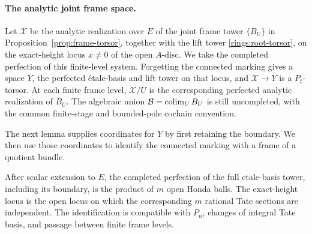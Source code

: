 \paragraph{The analytic joint frame space.}
Let $\mathcal X$ be the analytic realization over $E$ of the
joint frame tower $\{B_U\}$ in Proposition~\ref{prop:frame-torsor},
together with the lift tower \eqref{rings:root-torsor}, on the
exact-height locus $x\ne0$ of the open $A$-disc.  We take the
completed perfection of this finite-level system.  Forgetting the
connected marking gives a space $Y$, the perfected \'etale-basis
and lift tower on that locus, and $\mathcal X\to Y$ is a
$P_t$-torsor.  At each finite frame level, $\mathcal X/U$ is the
corresponding perfected analytic realization of $B_U$.
The algebraic union $\mathcal B=\operatorname*{colim}_U B_U$ is still uncompleted,
with the common finite-stage and bounded-pole cochain convention.

The next lemma supplies coordinates for $Y$ by first retaining
the boundary.  We then use those coordinates to identify the
connected marking with a frame of a quotient bundle.

\begin{lemma}\label{support:tate-ball}
After scalar extension to $E$, the completed perfection of the full
etale-basis tower, including its boundary, is the product of $m$ open
Honda balls.  The exact-height locus is the open locus on which the
corresponding $m$ rational Tate sections are independent.  The
identification is compatible with $P_n$, changes of integral Tate basis,
and passage between finite frame levels.
\end{lemma}

